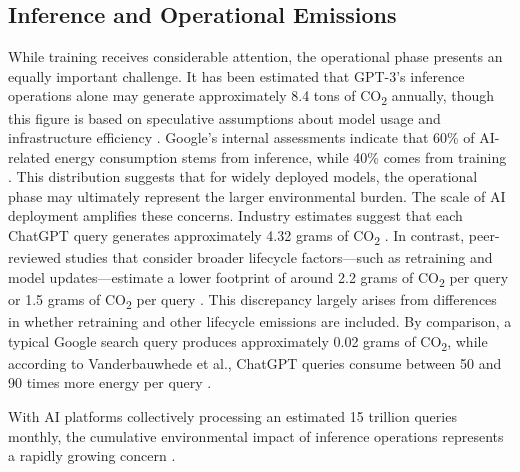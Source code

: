 \documentclass[twoside]{ai_ethics_class}
\begin{document}
\subsection{Inference and Operational Emissions}
While training receives considerable attention, the operational phase presents an equally important challenge.
It has been estimated that GPT-3's inference operations alone may generate approximately 8.4 tons of CO\textsubscript{2} annually, though this figure is based on speculative assumptions about model usage and infrastructure efficiency \cite{lboro2024inference}.
Google's internal assessments indicate that 60\% of AI-related energy consumption stems from inference, while 40\% comes from training \cite{patterson2022carbon}.
This distribution suggests that for widely deployed models, the operational phase may ultimately represent the larger environmental burden.
The scale of AI deployment amplifies these concerns.
Industry estimates suggest that each ChatGPT query generates approximately 4.32 grams of CO\textsubscript{2} \cite{smartly2024inference}.
In contrast, peer-reviewed studies that consider broader lifecycle factors—such as retraining and model updates—estimate a lower footprint of around 2.2 grams of CO\textsubscript{2} per query \cite{tomlinson2024carbon} or 1.5 grams of CO\textsubscript{2} per query \cite{vanderbauwhede2024estimating}.
This discrepancy largely arises from differences in whether retraining and other lifecycle emissions are included.
By comparison, a typical Google search query produces approximately 0.02 grams of CO\textsubscript{2}, while according to Vanderbauwhede et al., ChatGPT queries consume between 50 and 90 times more energy per query \cite{vanderbauwhede2024estimating}.

With AI platforms collectively processing an estimated 15 trillion queries monthly, the cumulative environmental impact of inference operations represents a rapidly growing concern \cite{planbe2024trillions}.
\end{document}
